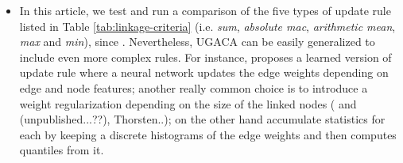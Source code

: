 \begin{itemize}
\item In this article, we test and run a comparison of the five types of update rule listed in Table \ref{tab:linkage-criteria} (i.e. \emph{sum}, \emph{absolute mac}, \emph{arithmetic mean}, \emph{max} and \emph{min}), since . Nevertheless, UGACA can be easily generalized to include even more complex rules. For instance, \cite{nunez2013machine} proposes a learned version of update rule where a neural network updates the edge weights depending on edge and node features; another really common choice is to introduce a weight regularization depending on the size of the linked nodes (\cite{felzenszwalb2004efficient} and \cite{kardoostsolving} (unpublished...??), Thorsten..); 
\cite{funke2018large} on the other hand accumulate statistics for each  by keeping a discrete histograms of the edge weights and then computes quantiles from it.
\end{itemize}



            



